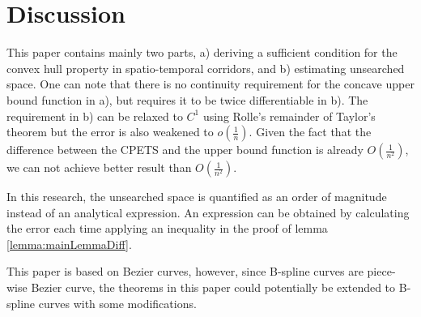 \section{Discussion} \label{Discussion}
This paper contains mainly two parts, a) deriving a sufficient condition for the convex hull property in spatio-temporal corridors, and b) estimating unsearched space. One can note that there is no continuity requirement for the concave upper bound function in a), but requires it to be twice differentiable in b). The requirement in b) can be relaxed to $C^{1}$ using Rolle's remainder of Taylor's theorem but the error is also weakened to $o(\frac{1}{n})$. Given the fact that the difference between the CPETS and the upper bound function is already $O(\frac{1}{n^2})$, we can not achieve better result than $O(\frac{1}{n^2})$.

In this research, the unsearched space is quantified as an order of magnitude instead of an analytical expression. An expression can be obtained by calculating the error each time applying an inequality in the proof of lemma \ref{lemma:mainLemmaDiff}.

This paper is based on Bezier curves, however, since B-spline curves are piece-wise Bezier curve, the theorems in this paper could potentially be extended to B-spline curves with some modifications.